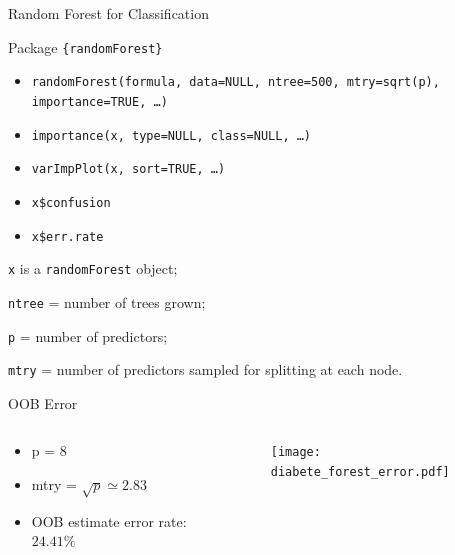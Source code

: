 

\begin{frame}{Random Forest for Classification}

{\footnotesize Package \texttt{\{randomForest\}}\vspace{-1ex}
\begin{itemize}\setlength{\itemsep}{-0.5ex}
	\item \texttt{randomForest(formula, data={\color{blue}NULL}, ntree={\color{red}500}, mtry={\color{blue}sqrt}(p), importance={\color{red}TRUE}, \dots)}
	\item \texttt{importance(x, type={\color{blue}NULL}, class={\color{blue}NULL}, \dots)}
    \item \texttt{varImpPlot(x, sort={\color{red}TRUE}, \dots)}
    \item \texttt{x\$confusion}
    \item \texttt{x\$err.rate}
\end{itemize}}

{\texttt{x}} is a {\texttt{randomForest}} object;

{\texttt{ntree}} = number of trees grown;

{\texttt{p}} = number of predictors;

{\texttt{mtry}} = number of predictors sampled for splitting at each node.

\end{frame}


\begin{frame}{OOB Error}
\begin{columns}
\begin{column}{0.35\textwidth}

{\footnotesize \begin{itemize}
    \item p = 8
    \item mtry = $\sqrt{p} \simeq 2.83$ 
    \item OOB estimate error rate: $24.41\%$
\end{itemize}}

\end{column}
\begin{column}{0.75\textwidth}
\begin{figure}
\texttt{[image: diabete\_forest\_error.pdf]}
\end{figure}
\end{column}
\end{columns}
\end{frame}

